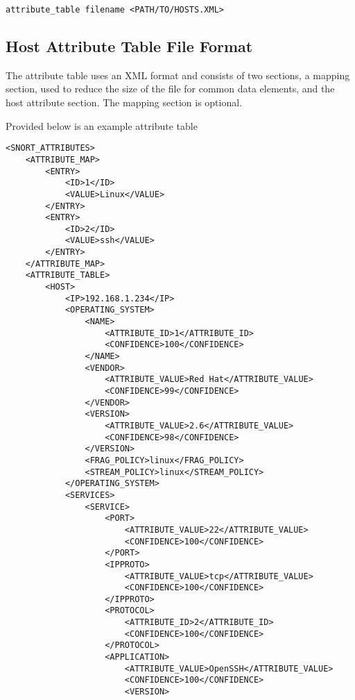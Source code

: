 \documentclass[english]{report}
\begin{document}
\begin{verbatim}
attribute_table filename <PATH/TO/HOSTS.XML>
\end{verbatim}

\subsection{Host Attribute Table File Format}

The attribute table uses an XML format and consists of two sections, a mapping
section, used to reduce the size of the file for common data elements, and the
host attribute section.  The mapping section is optional.

Provided below is an example attribute table

\begin{verbatim}
<SNORT_ATTRIBUTES>
    <ATTRIBUTE_MAP>
        <ENTRY>
            <ID>1</ID>
            <VALUE>Linux</VALUE>
        </ENTRY>
        <ENTRY>
            <ID>2</ID>
            <VALUE>ssh</VALUE>
        </ENTRY>
    </ATTRIBUTE_MAP>
    <ATTRIBUTE_TABLE>
        <HOST>
            <IP>192.168.1.234</IP>
            <OPERATING_SYSTEM>
                <NAME>
                    <ATTRIBUTE_ID>1</ATTRIBUTE_ID>
                    <CONFIDENCE>100</CONFIDENCE>
                </NAME>
                <VENDOR>
                    <ATTRIBUTE_VALUE>Red Hat</ATTRIBUTE_VALUE>
                    <CONFIDENCE>99</CONFIDENCE>
                </VENDOR>
                <VERSION>
                    <ATTRIBUTE_VALUE>2.6</ATTRIBUTE_VALUE>
                    <CONFIDENCE>98</CONFIDENCE>
                </VERSION>
                <FRAG_POLICY>linux</FRAG_POLICY>
                <STREAM_POLICY>linux</STREAM_POLICY>
            </OPERATING_SYSTEM>
            <SERVICES>
                <SERVICE>
                    <PORT>
                        <ATTRIBUTE_VALUE>22</ATTRIBUTE_VALUE>
                        <CONFIDENCE>100</CONFIDENCE>
                    </PORT>
                    <IPPROTO>
                        <ATTRIBUTE_VALUE>tcp</ATTRIBUTE_VALUE>
                        <CONFIDENCE>100</CONFIDENCE>
                    </IPPROTO>
                    <PROTOCOL>
                        <ATTRIBUTE_ID>2</ATTRIBUTE_ID>
                        <CONFIDENCE>100</CONFIDENCE>
                    </PROTOCOL>
                    <APPLICATION>
                        <ATTRIBUTE_VALUE>OpenSSH</ATTRIBUTE_VALUE>
                        <CONFIDENCE>100</CONFIDENCE>
                        <VERSION>

\end{verbatim}
\end{document}

